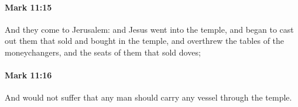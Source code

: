 		\paragraph{Mark 11:15} %
			\label{MARK-11-15}

			And they come to Jerusalem: and Jesus went into the temple, and began to cast out them that sold and bought in the temple, and overthrew the tables of the moneychangers, and the seats of them that sold doves;

			\begin{framed}
			\scriptsize
				\begin{compactdesc}
					\item[SBLG] 
				\end{compactdesc}
			\end{framed}

		\paragraph{Mark 11:16} %
			\label{MARK-11-16}

			And would not suffer that any man should carry any vessel through the temple.

